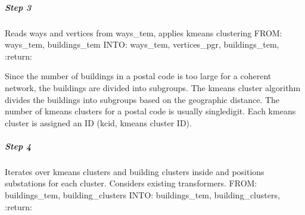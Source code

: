 \documentclass[letterpaper,10pt,english]{sphinxmanual}
\begin{document}
\subparagraph{Step 3}
\label{\detokenize{grid_generation/explanation/grid_generation_process:step-3}}

\begin{fulllineitems}
\label{\detokenize{grid_generation/explanation/grid_generation_process:syngrid.GridGenerator.GridGenerator.apply_kmeans_clustering}}
\pysigstartsignatures
{}
\pysigstopsignatures
\sphinxAtStartPar
Reads ways and vertices from ways\_tem, applies k\sphinxhyphen{}means clustering
FROM: ways\_tem, buildings\_tem
INTO: ways\_tem, vertices\_pgr, buildings\_tem,
:return:

\end{fulllineitems}


\sphinxAtStartPar
Since the number of buildings in a postal code is too large for a coherent
network, the buildings are divided into subgroups.
The kmeans cluster algorithm divides the buildings into subgroups based on the geographic distance.
The number of kmeans clusters
for a postal code is usually single\sphinxhyphen{}digit. Each kmeans cluster is assigned an ID
(kcid, kmeans cluster ID).


\subparagraph{Step 4}
\label{\detokenize{grid_generation/explanation/grid_generation_process:step-4}}

\begin{fulllineitems}
\label{\detokenize{grid_generation/explanation/grid_generation_process:syngrid.GridGenerator.GridGenerator.position_substations}}
\pysigstartsignatures
{}
\pysigstopsignatures
\sphinxAtStartPar
Iterates over k\sphinxhyphen{}means clusters and building clusters inside and positions substations for each cluster.
Considers existing transformers.
FROM: buildings\_tem, building\_clusters
INTO: buildings\_tem, building\_clusters,
:return:

\end{fulllineitems}
\end{document}
